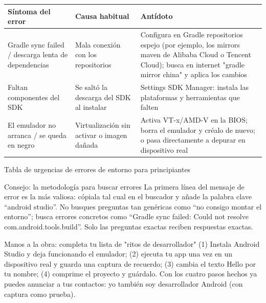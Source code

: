 \begin{center}
\begin{tabularx}{\linewidth}{|X|X|X|}
\hline
\textbf{Síntoma del error} & \textbf{Causa habitual} & \textbf{Antídoto} \tabularnewline
\hline
Gradle sync failed / descarga lenta de dependencias & Mala conexión con los repositorios & Configura en Gradle repositorios espejo (por ejemplo, los mirrors maven de Alibaba Cloud o Tencent Cloud); busca en internet "gradle mirror china" y aplica los cambios \tabularnewline
Faltan componentes del SDK & Se saltó la descarga del SDK al instalar & Settings SDK Manager: instala las plataformas y herramientas que falten \tabularnewline
El emulador no arranca / se queda en negro & Virtualización sin activar o imagen dañada & Activa VT-x/AMD-V en la BIOS; borra el emulador y créalo de nuevo; o pasa directamente a depurar en dispositivo real \tabularnewline
\hline
\end{tabularx}
\end{center}

\begin{center}\small\color{gray}Tabla de urgencias de errores de entorno para principiantes\end{center}

\begin{tcbinfo}{Consejo: la metodología para buscar errores}
La primera línea del mensaje de error es la más valiosa: cópiala tal cual en el buscador y añade la palabra clave “android studio”. No busques preguntas tan genéricas como “no consigo montar el entorno”; busca errores concretos como “Gradle sync failed: Could not resolve com.android.tools.build”. Solo las preguntas exactas reciben respuestas exactas.

\end{tcbinfo}

\begin{tcbpractice}{Manos a la obra: completa tu lista de "ritos de desarrollador"}
(1) Instala Android Studio y deja funcionando el emulador; (2) ejecuta tu app una vez en un dispositivo real y guarda una captura de recuerdo; (3) cambia el texto Hello por tu nombre; (4) comprime el proyecto y guárdalo. Con los cuatro pasos hechos ya puedes anunciar a tus contactos: yo también soy desarrollador Android (con captura como prueba).

\end{tcbpractice}


